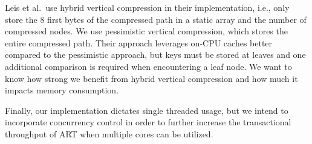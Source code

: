 \documentclass[abstracton,12pt]{scrartcl}
\theoremstyle{definition}
\begin{document}
Leis et al.\ use hybrid vertical compression in their implementation, 
i.e., only store the 8 first bytes of the compressed path in a static array 
and the number of compressed nodes. We use pessimistic vertical compression, 
which stores the entire compressed path.
Their approach leverages on-CPU caches better compared to the pessimistic
approach, but keys must be stored at leaves and one additional comparison is
required when encountering a leaf node. We want to know how strong we benefit 
from hybrid vertical compression and how much it impacts memory consumption.

Finally, our implementation dictates single threaded usage, but we intend to
incorporate concurrency control in order to further increase the transactional
throughput of ART when multiple cores can be utilized.

\newpage



\end{document}
